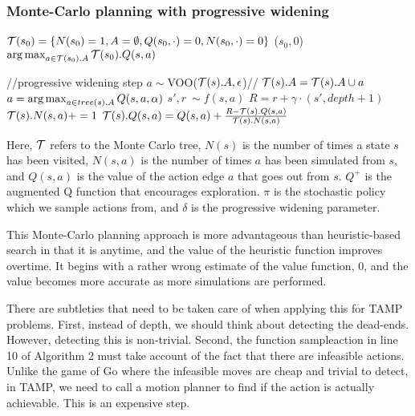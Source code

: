 \documentclass[10pt,letterpaper]{article}
\begin{document}
\subsubsection{Monte-Carlo planning with progressive widening}

\begin{algorithm}[htb]
\small
   \caption{($s_0$)}
   \label{alg:search}
\begin{algorithmic}[1]
\STATE $\mathcal{T}(s_0) = \{ N(s_0)=1,A=\emptyset,Q(s_0,\cdot)=0,N(s_0,\cdot)=0 \}$
\REPEAT
{}($s_0,0$)
 $\operatorname{arg\,max}_{a\in\mathcal{T}(s_0).A} \mathcal{T}(s_0).Q(s,a)$
\end{algorithmic}
\end{algorithm}

\begin{algorithm}[htb]
\small
   \caption{($s, T, \delta, \alpha, \epsilon, S_G$)}
   \label{alg:simulate}
\begin{algorithmic}[1]
 
 
\ENDIF
{}
\STATE //progressive widening step
\STATE $a \sim ${\sc VOO}($\mathcal{T}(s).A, \epsilon$)// 
\STATE $\mathcal{T}(s).A = \mathcal{T}(s).A \cup a$
\ELSE
\STATE $a = \operatorname{arg\,max}_{a \in tree(s).A} Q(s,a, \alpha)$
\ENDIF
\STATE $s',r ~ \sim f(s,a)$
\STATE $R = r + \gamma \cdot $$(s',depth+1)$
\STATE $\mathcal{T}(s).N(s,a) += 1$
\STATE $\mathcal{T}(s).Q(s,a) = Q(s,a) + \frac{R-\mathcal{T}(s).Q(s,a)}{\mathcal{T}(s).N(s,a)}$
\end{algorithmic}
\end{algorithm}

Here, $\mathcal{T}$ refers to the Monte Carlo tree, $N(s)$
is the number of times a state $s$ has been visited, $N(s,a)$ is
the number of times $a$ has been simulated from $s$, and $Q(s,a)$ is
the value of the action edge $a$ that goes out from $s$. $Q^+$ is the
augmented Q function that encourages exploration. $\pi$ is the stochastic
policy which we sample actions from, and $\delta$ is the progressive
widening parameter.

This Monte-Carlo planning approach is more advantageous
than heuristic-based search in that it is anytime, and the value
of the heuristic function improves overtime. It begins with a 
rather wrong estimate of the value function, 0, and the value
becomes more accurate as more simulations are performed.

There are subtleties that need to be taken care of when applying
this for TAMP problems. First, instead of depth, we should think
about detecting the dead-ends. However, detecting this is non-trivial.
Second, the function {\sc sampleaction} in line 10 of Algorithm 2 must take account
of the fact that there are infeasible actions. Unlike the 
game of Go where the infeasible moves are cheap and trivial to
detect, in TAMP, we need to call a motion planner to
find if the action is actually achievable. This is an expensive
step.
\end{document}
